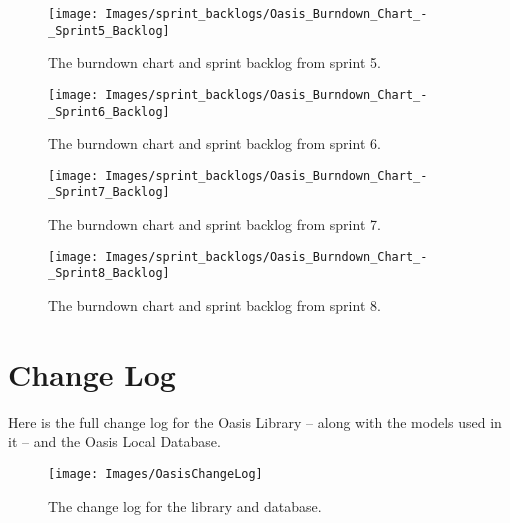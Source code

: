 \begin{figure}[htbp]
	\centering
		\texttt{[image: Images/sprint\_backlogs/Oasis\_Burndown\_Chart\_-\_Sprint5\_Backlog]}
	\caption{The burndown chart and sprint backlog from sprint 5.}
	\label{fig:sprint5}
\end{figure}

\begin{figure}[htbp]
	\centering
		\texttt{[image: Images/sprint\_backlogs/Oasis\_Burndown\_Chart\_-\_Sprint6\_Backlog]}
	\caption{The burndown chart and sprint backlog from sprint 6.}
	\label{fig:sprint6}
\end{figure}

\begin{figure}[htbp]
	\centering
		\texttt{[image: Images/sprint\_backlogs/Oasis\_Burndown\_Chart\_-\_Sprint7\_Backlog]}
	\caption{The burndown chart and sprint backlog from sprint 7.}
	\label{fig:sprint7}
\end{figure}

\begin{figure}[htbp]
	\centering
		\texttt{[image: Images/sprint\_backlogs/Oasis\_Burndown\_Chart\_-\_Sprint8\_Backlog]}
	\caption{The burndown chart and sprint backlog from sprint 8.}
	\label{fig:sprint8}
\end{figure}

\section{Change Log}
\label{sec:change_log}
Here is the full change log for the Oasis Library -- along with the models used in it -- and the Oasis Local Database.

\begin{figure}[htbp]
	\centering
		\texttt{[image: Images/OasisChangeLog]}
	\caption{The change log for the library and database.}
	\label{fig:change_log}
\end{figure}

